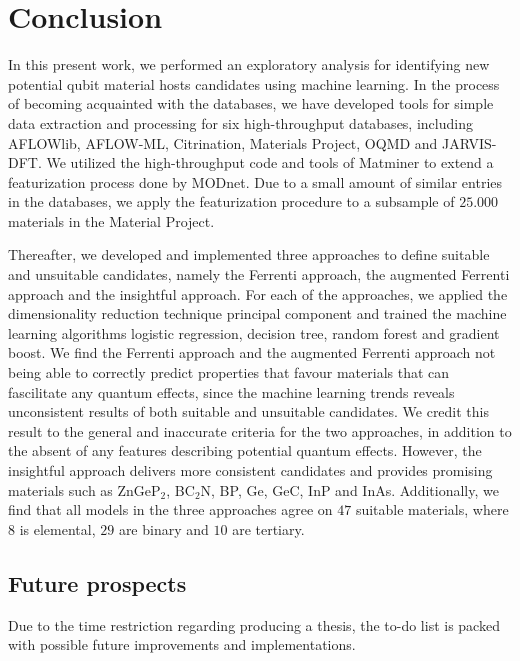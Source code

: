 \chapter*{Conclusion}

In this present work, we performed an exploratory analysis for identifying new potential qubit material hosts candidates using machine learning. In the process of becoming acquainted with the databases, we have developed tools for simple data extraction and processing for six high-throughput databases, including AFLOWlib, AFLOW-ML, Citrination, Materials Project, OQMD and JARVIS-DFT. We utilized the high-throughput code and tools of Matminer to extend a featurization process done by MODnet. Due to a small amount of similar entries in the databases, we apply the featurization procedure to a subsample of $25.000$ materials in the Material Project.

Thereafter, we developed and implemented three approaches to define suitable and unsuitable candidates, namely the Ferrenti approach, the augmented Ferrenti approach and the insightful approach. For each of the approaches, we applied the dimensionality reduction technique principal component and trained the machine learning algorithms logistic regression, decision tree, random forest and gradient boost. We find the Ferrenti approach and the augmented Ferrenti approach not being able to correctly predict properties that favour materials that can fascilitate any quantum effects, since the machine learning trends reveals unconsistent results of both suitable and unsuitable candidates. We credit this result to the general and inaccurate criteria for the two approaches, in addition to the absent of any features describing potential quantum effects. However, the insightful approach delivers more consistent candidates and provides promising materials such as ZnGeP$_2$, BC$_2$N, BP, Ge, GeC, InP and InAs. Additionally, we find that all models in the three approaches agree on $47$ suitable materials, where $8$ is elemental, $29$ are binary and $10$ are tertiary. %
\clearpage
\section*{Future prospects}

Due to the time restriction regarding producing a thesis, the to-do list is packed with possible future improvements and implementations.
\vspace{10pt}

